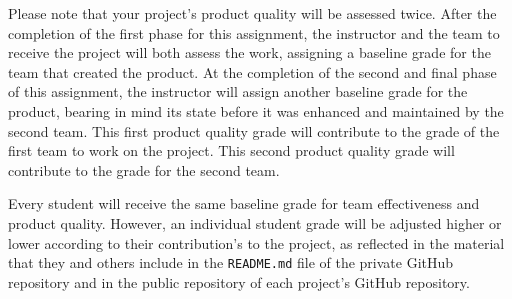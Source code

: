 \documentclass[11pt]{article}
\newcommand{\reflection}{\lstinline{README.md}}
\begin{document}
Please note that your project's product quality will be assessed twice. After the completion of the first phase for this
assignment, the instructor and the team to receive the project will both assess the work, assigning a baseline grade for
the team that created the product. At the completion of the second and final phase of this assignment, the instructor
will assign another baseline grade for the product, bearing in mind its state before it was enhanced and maintained by
the second team. This first product quality grade will contribute to the grade of the first team to work on the project.
This second product quality grade will contribute to the grade for the second team.

Every student will receive the same baseline grade for team effectiveness and product quality. However, an individual
student grade will be adjusted higher or lower according to their contribution's to the project, as reflected in the
material that they and others include in the \reflection{} file of the private GitHub repository and in the public
repository of each project's GitHub repository.



\end{document}
